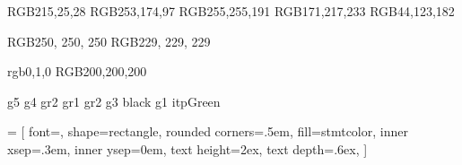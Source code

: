 
\usepackage[utf8]{inputenc}
\usepackage{xspace}
\usepackage{tabularx}
\usepackage[%
hyperindex,%
plainpages=false,%
pdfusetitle]{hyperref}
\usepackage[all]{hypcap}
\usepackage{algorithm}
\usepackage[noend]{algpseudocode}
\usepackage{cite}
\usepackage{booktabs}
\usepackage{url}
\usepackage{listings}
\usepackage{enumitem}
\usepackage{amsthm}
\usepackage{amsmath}
\usepackage{tikz}
\usetikzlibrary{positioning,shapes.geometric, arrows.meta ,automata, decorations.pathreplacing, calc, fit, backgrounds}
\usepackage{pgf}
\usepackage{slantsc}
\usepackage{geometry}
\usepackage{amssymb}
\usepackage{subcaption}
\usepackage{float}
\usepackage{pgf}
\usepackage{slashbox}
\usepackage{pgfgantt}
\usepackage{wrapfig}
\usepackage{pdflscape}
\usepackage{xcolor}
\usepackage{xparse}
\usepackage[%
colorinlistoftodos,%
color=cyan!50!white,%
bordercolor=cyan!50!black]{todonotes}

\usepackage{varwidth}
\usepackage[most]{tcolorbox}%
\usepackage{comment}
\usepackage{makecell}
\usepackage{stmaryrd}



\definecolor{g1}		{RGB}{215,25,28} %
\definecolor{g2}		{RGB}{253,174,97} %
\definecolor{g3}		{RGB}{255,255,191} %
\definecolor{g4}		{RGB}{171,217,233} %
\definecolor{g5}		{RGB}{44,123,182} %

\definecolor{gr1}		{RGB}{250, 250, 250}
\definecolor{gr2}		{RGB}{229, 229, 229} %

\definecolor{itpGreen}  {rgb}{0,1,0}
\definecolor{grey}      {RGB}{200,200,200}


		{g5}
			{g4}
			{gr2}
		{gr1}
		{gr2} %
	{g3} %
     {black} %
      {g1} %
              {itpGreen}



 = [%
font=\ttfamily,%
shape=rectangle,%
rounded corners=.5em,%
fill=stmtcolor,%
inner xsep=.3em,%
inner ysep=0em, %
text height=2ex, %
text depth=.6ex,
]


